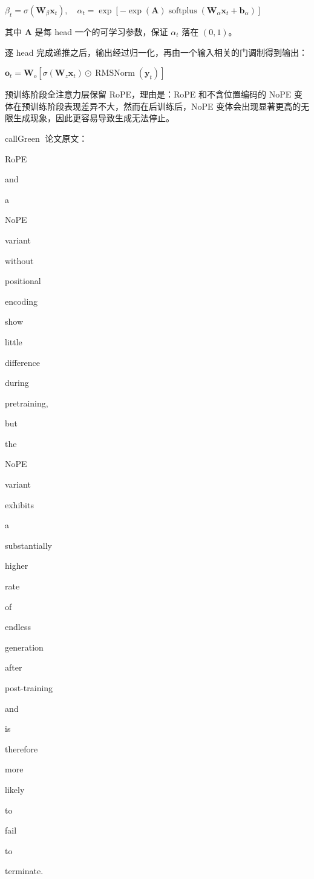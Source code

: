 \documentclass[zihao=false,fontset=windows]{ctexart}
\newcommand{\bigmath}[1]{%
  \begin{center}\large$\displaystyle #1$\end{center}%
}
\begin{document}
\bigmath{\beta_t=\sigma(\mathbf W_\beta\mathbf x_t),\quad\alpha_t=\exp[-\exp(\mathbf A)\operatorname{softplus}(\mathbf W_\alpha\mathbf x_t+\mathbf b_\alpha)]}
其中 $\mathbf A$ 是每 head 一个的可学习参数，保证 $\alpha_t$ 落在 $(0,1)$。


\par\vspace{0.75em}\par\vspace{0.28em}
逐 head 完成递推之后，输出经过归一化，再由一个输入相关的门调制得到输出：

\bigmath{\mathbf o_t=\mathbf W_o[\sigma(\mathbf W_z\mathbf x_t)\odot\operatorname{RMSNorm}(\mathbf y_t)]}
\par\vspace{0.75em}\par\vspace{0.28em}
预训练阶段全注意力层保留 RoPE，理由是：RoPE 和不含位置编码的 NoPE 变体在预训练阶段表现差异不大，然而在后训练后，NoPE 变体会出现显著更高的无限生成现象，因此更容易导致生成无法停止。

\begin{feishubox}{callGreen}{📎}
论文原文：{\setlength{\fboxsep}{0pt}\colorbox{inlinebg}{\strut\ttfamily RoPE} \colorbox{inlinebg}{\strut\ttfamily and} \colorbox{inlinebg}{\strut\ttfamily a} \colorbox{inlinebg}{\strut\ttfamily NoPE} \colorbox{inlinebg}{\strut\ttfamily variant} \colorbox{inlinebg}{\strut\ttfamily without} \colorbox{inlinebg}{\strut\ttfamily positional} \colorbox{inlinebg}{\strut\ttfamily encoding} \colorbox{inlinebg}{\strut\ttfamily show} \colorbox{inlinebg}{\strut\ttfamily little} \colorbox{inlinebg}{\strut\ttfamily difference} \colorbox{inlinebg}{\strut\ttfamily during} \colorbox{inlinebg}{\strut\ttfamily pretraining,} \colorbox{inlinebg}{\strut\ttfamily but} \colorbox{inlinebg}{\strut\ttfamily the} \colorbox{inlinebg}{\strut\ttfamily NoPE} \colorbox{inlinebg}{\strut\ttfamily variant} \colorbox{inlinebg}{\strut\ttfamily exhibits} \colorbox{inlinebg}{\strut\ttfamily a} \colorbox{inlinebg}{\strut\ttfamily substantially} \colorbox{inlinebg}{\strut\ttfamily higher} \colorbox{inlinebg}{\strut\ttfamily rate} \colorbox{inlinebg}{\strut\ttfamily of} \colorbox{inlinebg}{\strut\ttfamily endless} \colorbox{inlinebg}{\strut\ttfamily generation} \colorbox{inlinebg}{\strut\ttfamily after} \colorbox{inlinebg}{\strut\ttfamily post-training} \colorbox{inlinebg}{\strut\ttfamily and} \colorbox{inlinebg}{\strut\ttfamily is} \colorbox{inlinebg}{\strut\ttfamily therefore} \colorbox{inlinebg}{\strut\ttfamily more} \colorbox{inlinebg}{\strut\ttfamily likely} \colorbox{inlinebg}{\strut\ttfamily to} \colorbox{inlinebg}{\strut\ttfamily fail} \colorbox{inlinebg}{\strut\ttfamily to} \colorbox{inlinebg}{\strut\ttfamily terminate.}}

\end{feishubox}
\end{document}
